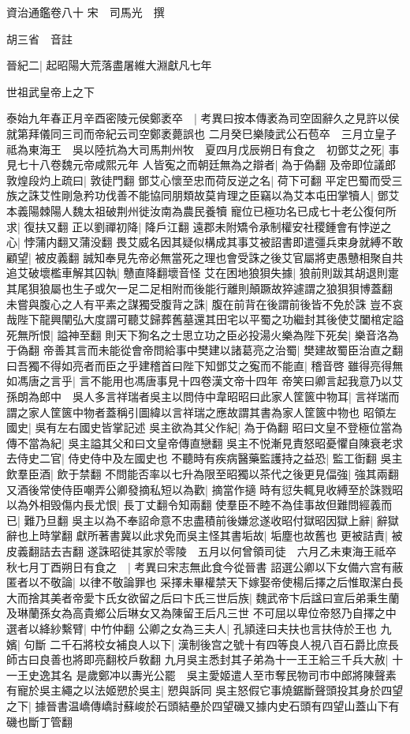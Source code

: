 資治通鑑卷八十
宋　司馬光　撰

胡三省　音註

晉紀二|{
	起昭陽大荒落盡屠維大淵獻凡七年}


世祖武皇帝上之下

泰始九年春正月辛酉密陵元侯鄭袤卒　|{
	考異曰按本傳袤為司空固辭久之見許以侯就第拜儀同三司而帝紀云司空鄭袤薨誤也}
二月癸巳樂陵武公石苞卒　三月立皇子祗為東海王　吳以陸抗為大司馬荆州牧　夏四月戊辰朔日有食之　初鄧艾之死|{
	事見七十八卷魏元帝咸熙元年}
人皆寃之而朝廷無為之辯者|{
	為于偽翻}
及帝即位議郎敦煌段灼上疏曰|{
	敦徒門翻}
鄧艾心懷至忠而荷反逆之名|{
	荷下可翻}
平定巴蜀而受三族之誅艾性剛急矜功伐善不能協同朋類故莫肯理之臣竊以為艾本屯田掌犢人|{
	鄧艾本義陽棘陽人魏太祖破荆州徙汝南為農民養犢}
寵位已極功名已成七十老公復何所求|{
	復扶又翻}
正以劉禪初降|{
	降戶江翻}
遠郡未附矯令承制權安社稷鍾會有悖逆之心|{
	悖蒲内翻又蒲没翻}
畏艾威名因其疑似構成其事艾被詔書即遣彊兵束身就縛不敢顧望|{
	被皮義翻}
誠知奉見先帝必無當死之理也會受誅之後艾官屬將吏愚戇相聚自共追艾破壞檻車解其囚執|{
	戇直降翻壞音怪}
艾在困地狼狽失據|{
	狼前則跋其胡退則疐其尾狽狼屬也生子或欠一足二足相附而後能行離則顛蹶故猝遽謂之狼狽狽博蓋翻}
未嘗與腹心之人有平素之謀獨受腹背之誅|{
	腹在前背在後謂前後皆不免於誅}
豈不哀哉陛下龍興闡弘大度謂可聽艾歸葬舊墓還其田宅以平蜀之功繼封其後使艾闔棺定謚死無所恨|{
	謚神至翻}
則天下狥名之士思立功之臣必投湯火樂為陛下死矣|{
	樂音洛為于偽翻}
帝善其言而未能從會帝問給事中樊建以諸葛亮之治蜀|{
	樊建故蜀臣治直之翻}
曰吾獨不得如亮者而臣之乎建稽首曰陛下知鄧艾之寃而不能直|{
	稽音啓}
雖得亮得無如馮唐之言乎|{
	言不能用也馮唐事見十四卷漢文帝十四年}
帝笑曰卿言起我意乃以艾孫朗為郎中　吳人多言祥瑞者吳主以問侍中韋昭昭曰此家人筐篋中物耳|{
	言祥瑞而謂之家人筐篋中物者蓋稱引圖緯以言祥瑞之應故謂其書為家人筐篋中物也}
昭領左國史|{
	吳有左右國史皆掌記述}
吳主欲為其父作紀|{
	為于偽翻}
昭曰文皇不登極位當為傳不當為紀|{
	吳主謚其父和曰文皇帝傳直戀翻}
吳主不悦漸見責怒昭憂懼自陳衰老求去侍史二官|{
	侍史侍中及左國史也}
不聽時有疾病醫藥監護持之益恐|{
	監工衘翻}
吳主飲羣臣酒|{
	飲于禁翻}
不問能否率以七升為限至昭獨以茶代之後更見偪強|{
	強其兩翻}
又酒後常使侍臣嘲弄公卿發摘私短以為歡|{
	摘當作擿}
時有愆失輒見收縛至於誅戮昭以為外相毁傷内長尤恨|{
	長丁丈翻令知兩翻}
使羣臣不睦不為佳事故但難問經義而已|{
	難乃旦翻}
吳主以為不奉詔命意不忠盡積前後嫌忿遂收昭付獄昭因獄上辭|{
	辭獄辭也上時掌翻}
獻所著書冀以此求免而吳主怪其書垢故|{
	垢塵也故舊也}
更被詰責|{
	被皮義翻詰去吉翻}
遂誅昭徙其家於零陵　五月以何曾領司徒　六月乙未東海王祗卒　秋七月丁酉朔日有食之　|{
	考異曰宋志無此食今從晉書}
詔選公卿以下女備六宫有蔽匿者以不敬論|{
	以律不敬論罪也}
采擇未畢權禁天下嫁娶帝使楊后擇之后惟取潔白長大而捨其美者帝愛卞氏女欲留之后曰卞氏三世后族|{
	魏武帝卞后諡曰宣后弟秉生蘭及琳蘭孫女為高貴鄉公后琳女又為陳留王后凡三世}
不可屈以卑位帝怒乃自擇之中選者以絳紗繫臂|{
	中竹仲翻}
公卿之女為三夫人|{
	孔頴逹曰夫扶也言扶侍於王也}
九嬪|{
	句斷}
二千石將校女補良人以下|{
	漢制後宫之號十有四等良人視八百石爵比庶長師古曰良善也將即亮翻校戶敎翻}
九月吳主悉封其子弟為十一王王給三千兵大赦|{
	十一王史逸其名}
是歲鄭冲以夀光公罷　吳主愛姬遣人至市奪民物司市中郎將陳聲素有寵於吳主繩之以法姬愬於吳主|{
	愬與訴同}
吳主怒假它事燒鋸斷聲頭投其身於四望之下|{
	據晉書温嶠傳嶠討蘇峻於石頭結壘於四望磯又據内史石頭有四望山蓋山下有磯也斷丁管翻}


